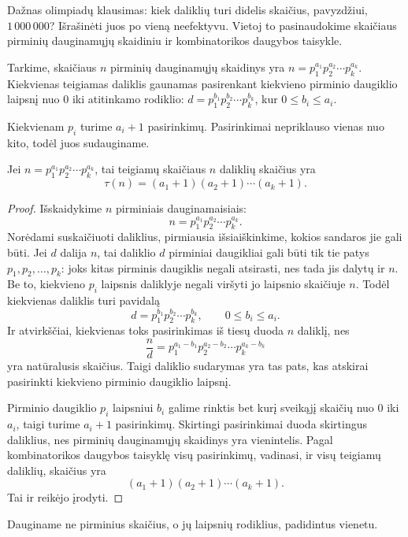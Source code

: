 \documentclass[11pt,a4paper]{scrartcl}
\begin{document}
Dažnas olimpiadų klausimas: kiek daliklių turi didelis skaičius, pavyzdžiui, $1\,000\,000$? Išrašinėti juos po vieną neefektyvu. Vietoj to pasinaudokime skaičiaus pirminių dauginamųjų skaidiniu ir kombinatorikos daugybos taisykle.

Tarkime, skaičiaus $n$ pirminių dauginamųjų skaidinys yra $n=p_1^{a_1}p_2^{a_2}\cdots p_k^{a_k}$. Kiekvienas teigiamas daliklis gaunamas pasirenkant kiekvieno pirminio daugiklio laipsnį nuo $0$ iki atitinkamo rodiklio: $d=p_1^{b_1}p_2^{b_2}\cdots p_k^{b_k}$, kur $0\le b_i\le a_i$.

Kiekvienam $p_i$ turime $a_i+1$ pasirinkimų. Pasirinkimai nepriklauso vienas nuo kito, todėl juos sudauginame.

\begin{proposition}
Jei $n=p_1^{a_1}p_2^{a_2}\cdots p_k^{a_k}$, tai teigiamų skaičiaus $n$ daliklių skaičius yra
\[
    \tau(n)=(a_1+1)(a_2+1)\cdots(a_k+1).
\]
\end{proposition}

\begin{proof}
Išskaidykime $n$ pirminiais dauginamaisiais:
\[
    n=p_1^{a_1}p_2^{a_2}\cdots p_k^{a_k}.
\]
Norėdami suskaičiuoti daliklius, pirmiausia išsiaiškinkime, kokios sandaros jie gali būti. Jei $d$ dalija $n$, tai daliklio $d$ pirminiai daugikliai gali būti tik tie patys $p_1,p_2,\ldots,p_k$: joks kitas pirminis daugiklis negali atsirasti, nes tada jis dalytų ir $n$. Be to, kiekvieno $p_i$ laipsnis daliklyje negali viršyti jo laipsnio skaičiuje $n$. Todėl kiekvienas daliklis turi pavidalą
\[
    d=p_1^{b_1}p_2^{b_2}\cdots p_k^{b_k},\qquad 0\le b_i\le a_i.
\]
Ir atvirkščiai, kiekvienas toks pasirinkimas iš tiesų duoda $n$ daliklį, nes
\[
    \frac{n}{d}=p_1^{a_1-b_1}p_2^{a_2-b_2}\cdots p_k^{a_k-b_k}
\]
yra natūralusis skaičius. Taigi daliklio sudarymas yra tas pats, kas atskirai pasirinkti kiekvieno pirminio daugiklio laipsnį.

Pirminio daugiklio $p_i$ laipsniui $b_i$ galime rinktis bet kurį sveikąjį skaičių nuo $0$ iki $a_i$, taigi turime $a_i+1$ pasirinkimų. Skirtingi pasirinkimai duoda skirtingus daliklius, nes pirminių dauginamųjų skaidinys yra vienintelis. Pagal kombinatorikos daugybos taisyklę visų pasirinkimų, vadinasi, ir visų teigiamų daliklių, skaičius yra
\[
    (a_1+1)(a_2+1)\cdots(a_k+1).
\]
Tai ir reikėjo įrodyti.
\end{proof}

\begin{remark*}
Dauginame ne pirminius skaičius, o jų laipsnių rodiklius, padidintus vienetu.
\end{remark*}
\end{document}
